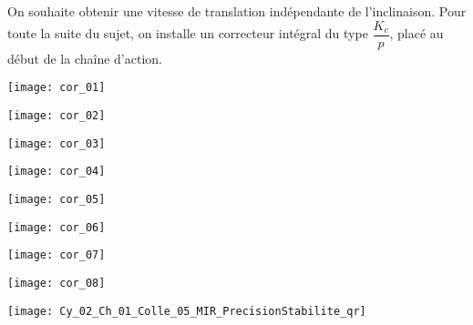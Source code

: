 On souhaite obtenir une vitesse de translation indépendante de l’inclinaison. Pour toute la suite du sujet, on installe un correcteur intégral du type $\dfrac{K_c}{p}$, placé au début de la chaîne d’action.

\ifprof
\begin{corrige}
\end{corrige}
\else
\fi


\ifprof
\begin{center}
	\texttt{[image: cor\_01]}
\end{center}

\begin{center}
	\texttt{[image: cor\_02]}
\end{center}

\begin{center}
	\texttt{[image: cor\_03]}
\end{center}

\begin{center}
	\texttt{[image: cor\_04]}
\end{center}

\begin{center}
	\texttt{[image: cor\_05]}
\end{center}

\begin{center}
	\texttt{[image: cor\_06]}
\end{center}

\begin{center}
	\texttt{[image: cor\_07]}
\end{center}

\begin{center}
	\texttt{[image: cor\_08]}
\end{center}
\else
\fi


\ifprof
\else
\begin{marginfigure}[-3cm]
\centering
\texttt{[image: Cy\_02\_Ch\_01\_Colle\_05\_MIR\_PrecisionStabilite\_qr]}
\end{marginfigure}
\fi
